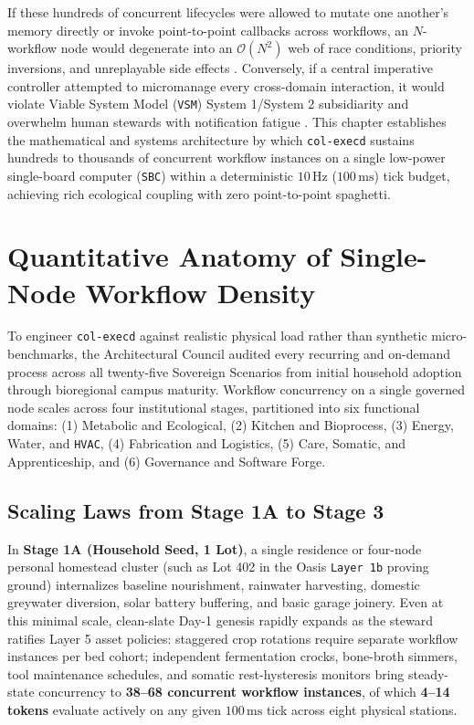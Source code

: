 If these hundreds of concurrent lifecycles were allowed to mutate one another's memory directly or invoke
point-to-point callbacks across workflows, an $N$-workflow node would degenerate into an
$\mathcal{O}(N^2)$ web of race conditions, priority inversions, and unreplayable side effects
\parencite{hewitt1973universal,miller2006robust}. Conversely, if a central imperative controller attempted
to micromanage every cross-domain interaction, it would violate Viable System Model (\texttt{VSM}) System
1/System 2 subsidiarity \parencite{beer1972,beer1979} and overwhelm human stewards with notification
fatigue \parencite{weiser1996calm}. This chapter establishes the mathematical and systems architecture by
which \texttt{col-execd} sustains hundreds to thousands of concurrent workflow instances on a single
low-power single-board computer (\texttt{SBC}) within a deterministic $10\,\mathrm{Hz}$
($100\,\mathrm{ms}$) tick budget, achieving rich ecological coupling with zero point-to-point spaghetti.

\section{Quantitative Anatomy of Single-Node Workflow Density}
\label{sec:workflow-density-anatomy}

To engineer \texttt{col-execd} against realistic physical load rather than synthetic micro-benchmarks, the
Architectural Council audited every recurring and on-demand process across all twenty-five Sovereign
Scenarios from initial household adoption through bioregional campus maturity. Workflow concurrency on a
single governed node scales across four institutional stages, partitioned into six functional domains: (1)
Metabolic and Ecological, (2) Kitchen and Bioprocess, (3) Energy, Water, and \texttt{HVAC}, (4)
Fabrication and Logistics, (5) Care, Somatic, and Apprenticeship, and (6) Governance and Software Forge.

\subsection{Scaling Laws from Stage 1A to Stage 3}

In \textbf{Stage 1A (Household Seed, 1 Lot)}, a single residence or four-node personal homestead cluster
(such as Lot 402 in the Oasis \texttt{Layer 1b} proving ground) internalizes baseline nourishment,
rainwater harvesting, domestic greywater diversion, solar battery buffering, and basic garage joinery.
Even at this minimal scale, clean-slate Day-1 genesis rapidly expands as the steward ratifies Layer 5
asset policies: staggered crop rotations require separate workflow instances per bed cohort; independent
fermentation crocks, bone-broth simmers, tool maintenance schedules, and somatic rest-hysteresis monitors
bring steady-state concurrency to \textbf{38--68 concurrent workflow instances}, of which \textbf{4--14
tokens} evaluate actively on any given $100\,\mathrm{ms}$ tick across eight physical stations.

